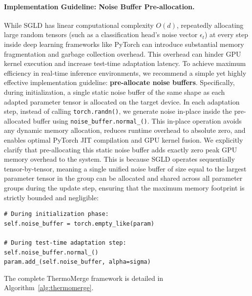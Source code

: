 \paragraph{Implementation Guideline: Noise Buffer Pre-allocation.} While SGLD has linear computational complexity $O(d)$, repeatedly allocating large random tensors (such as a classification head's noise vector $\epsilon_t$) at every step inside deep learning frameworks like PyTorch can introduce substantial memory fragmentation and garbage collection overhead.
This overhead can hinder GPU kernel execution and increase test-time adaptation latency.
To achieve maximum efficiency in real-time inference environments, we recommend a simple yet highly effective implementation guideline: \textbf{pre-allocate noise buffers}.
Specifically, during initialization, a single static noise buffer of the same shape as each adapted parameter tensor is allocated on the target device.
In each adaptation step, instead of calling \texttt{torch.randn()}, we generate noise in-place inside the pre-allocated buffer using \texttt{noise\_buffer.normal\_()}.
This in-place operation avoids any dynamic memory allocation, reduces runtime overhead to absolute zero, and enables optimal PyTorch JIT compilation and GPU kernel fusion.
We explicitly clarify that pre-allocating this static noise buffer adds exactly zero peak GPU memory overhead to the system.
This is because SGLD operates sequentially tensor-by-tensor, meaning a single unified noise buffer of size equal to the largest parameter tensor in the group can be allocated and shared across all parameter groups during the update step, ensuring that the maximum memory footprint is strictly bounded and negligible:
\begin{verbatim}
# During initialization phase:
self.noise_buffer = torch.empty_like(param)

# During test-time adaptation step:
self.noise_buffer.normal_()
param.add_(self.noise_buffer, alpha=sigma)
\end{verbatim}

The complete ThermoMerge framework is detailed in Algorithm~\ref{alg:thermomerge}.

